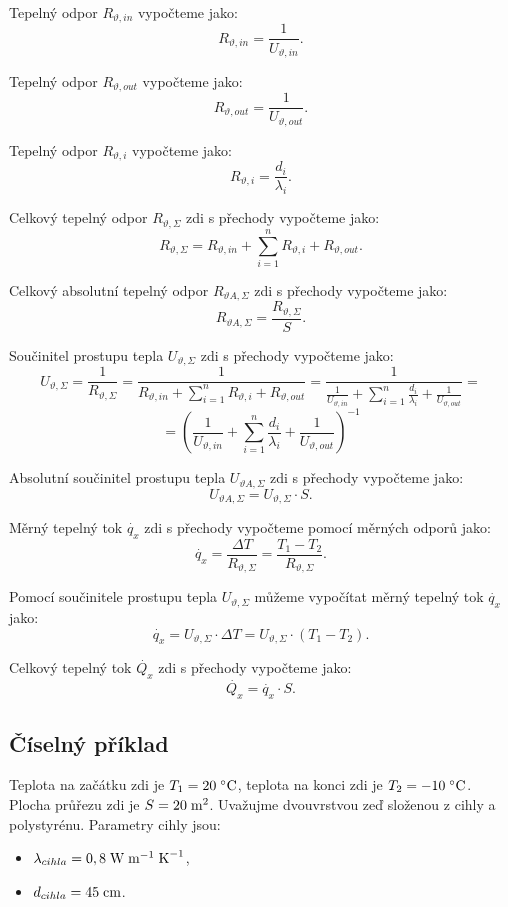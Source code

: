 \documentclass{article}
\begin{document}
Tepelný odpor $R_{\vartheta,in}$ vypočteme jako:
$$
    R_{\vartheta,in} = \frac{1}{U_{\vartheta,in}}.
$$

Tepelný odpor $R_{\vartheta,out}$ vypočteme jako:
$$
    R_{\vartheta,out} = \frac{1}{U_{\vartheta,out}}.
$$

Tepelný odpor $R_{\vartheta,i}$ vypočteme jako:
$$
    R_{\vartheta,i} = \frac{d_i}{\lambda_i}.
$$

Celkový tepelný odpor $R_{\vartheta,\Sigma}$ zdi s přechody vypočteme jako:
$$
    R_{\vartheta,\Sigma} = R_{\vartheta,in} + \sum_{i=1}^{n} R_{\vartheta,i} + R_{\vartheta,out}.
$$

Celkový absolutní tepelný odpor $R_{\vartheta A,\Sigma}$ zdi s přechody vypočteme jako:
$$
    R_{\vartheta A,\Sigma} = \frac{R_{\vartheta,\Sigma}}{S}.
$$

Součinitel prostupu tepla $U_{\vartheta,\Sigma}$ zdi s přechody vypočteme jako:
$$
    U_{\vartheta,\Sigma} = \frac{1}{R_{\vartheta,\Sigma}} = \frac{1}{R_{\vartheta,in} + \sum_{i=1}^{n} R_{\vartheta,i} + R_{\vartheta,out}} = \frac{1}{\frac{1}{U_{\vartheta,in}} + \sum_{i=1}^{n} \frac{d_i}{\lambda_i} + \frac{1}{U_{\vartheta,out}}} =
$$
$$
    = \left ( \frac{1}{U_{\vartheta,in}} + \sum_{i=1}^{n} \frac{d_i}{\lambda_i} + \frac{1}{U_{\vartheta,out}} \right )^{-1}
$$

Absolutní součinitel prostupu tepla $U_{\vartheta A,\Sigma}$ zdi s přechody vypočteme jako:
$$
    U_{\vartheta A,\Sigma} = U_{\vartheta,\Sigma} \cdot S.
$$

Měrný tepelný tok $\dot{q_x}$ zdi s přechody vypočteme pomocí měrných odporů jako:
$$
    \dot{q_x} = \frac{\Delta T}{R_{\vartheta,\Sigma}} = \frac{T_1 - T_2}{R_{\vartheta,\Sigma}}.
$$

Pomocí součinitele prostupu tepla $U_{\vartheta,\Sigma}$ můžeme vypočítat měrný tepelný tok $\dot{q_x}$ jako:
$$
    \dot{q_x} = U_{\vartheta,\Sigma} \cdot \Delta T = U_{\vartheta,\Sigma} \cdot (T_1 - T_2).
$$

Celkový tepelný tok $\dot{Q_x}$ zdi s přechody vypočteme jako:
$$
    \dot{Q_x} = \dot{q_x} \cdot S.
$$


\subsection{Číselný příklad}
Teplota na začátku zdi je $T_1 = 20 \; ^\circ \textrm{C}$, teplota na konci zdi je $T_2 = -10 \; ^\circ \textrm{C}$. Plocha průřezu zdi je $S = 20 \; \textrm{m}^{\textrm{2}}$. Uvažujme dvouvrstvou zeď složenou z cihly a polystyrénu. Parametry cihly jsou:
\begin{itemize}
    \item $\lambda_{cihla} = 0,8 \; \textrm{W} \; \textrm{m}^{-1} \; \textrm{K}^{-1}$,
    \item $d_{cihla} = 45 \; \textrm{cm}$.
\end{itemize}
\end{document}
